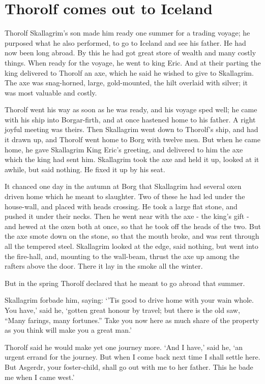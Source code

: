 \chapter{Thorolf comes out to Iceland}

Thorolf Skallagrim's son made him ready one summer for a trading voyage; he purposed what he also performed, to go to Iceland and see his father. He had now been long abroad. By this he had got great store of wealth and many costly things. When ready for the voyage, he went to king Eric. And at their parting the king delivered to Thorolf an axe, which he said he wished to give to Skallagrim. The axe was snag-horned, large, gold-mounted, the hilt overlaid with silver; it was most valuable and costly.

Thorolf went his way as soon as he was ready, and his voyage sped well; he came with his ship into Borgar-firth, and at once hastened home to his father. A right joyful meeting was theirs. Then Skallagrim went down to Thorolf's ship, and had it drawn up, and Thorolf went home to Borg with twelve men. But when he came home, he gave Skallagrim King Eric's greeting, and delivered to him the axe which the king had sent him. Skallagrim took the axe and held it up, looked at it awhile, but said nothing. He fixed it up by his seat.

It chanced one day in the autumn at Borg that Skallagrim had several oxen driven home which he meant to slaughter. Two of these he had led under the house-wall, and placed with heads crossing. He took a large flat stone, and pushed it under their necks. Then he went near with the axe - the king's gift - and hewed at the oxen both at once, so that he took off the heads of the two. But the axe smote down on the stone, so that the mouth broke, and was rent through all the tempered steel. Skallagrim looked at the edge, said nothing, but went into the fire-hall, and, mounting to the wall-beam, thrust the axe up among the rafters above the door. There it lay in the smoke all the winter.

But in the spring Thorolf declared that he meant to go abroad that summer.

Skallagrim forbade him, saying: `'Tis good to drive home with your wain whole. You have,' said he, `gotten great honour by travel; but there is the old saw, ``Many farings, many fortunes.'' Take you now here as much share of the property as you think will make you a great man.'

Thorolf said he would make yet one journey more. `And I have,' said he, `an urgent errand for the journey. But when I come back next time I shall settle here. But Asgerdr, your foster-child, shall go out with me to her father. This he bade me when I came west.'

